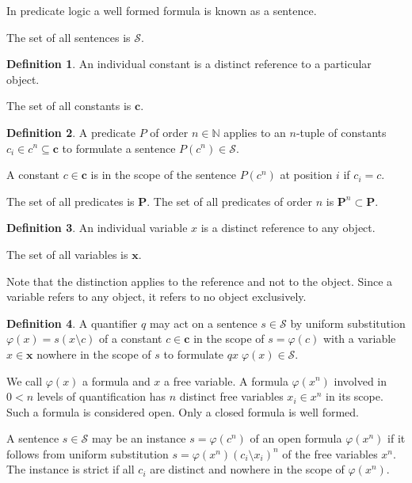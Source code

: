 \documentclass{amsbook}
\theoremstyle{definition}
\newtheorem{dfn}{Definition}[section]
\begin{document}
In predicate logic a well formed formula is known as a sentence.

The set of all sentences is $\mathcal S$.

\begin{dfn}
    An individual constant is a distinct reference to a particular object.

    The set of all constants is $\mathbf c$.
\end{dfn}

\begin{dfn}
    A predicate $P$ of order $n \in \mathbb N$ applies to an $n$-tuple of constants $c_i \in c^n \subseteq \mathbf c$ to formulate a sentence $P(c^n) \in \mathcal S$.

    A constant $c \in \mathbf c$ is in the scope of the sentence $P(c^n)$ at position $i$ if $c_i = c$.

    The set of all predicates is $\mathbf P$. The set of all predicates of order $n$ is $\mathbf P^n \subset \mathbf P$.
\end{dfn}

\begin{dfn}
    An individual variable $x$ is a distinct reference to any object.

    The set of all variables is $\mathbf x$.
\end{dfn}

Note that the distinction applies to the reference and not to the object. Since a variable refers to any object, it refers to no object exclusively.

\begin{dfn}
    A quantifier $q$ may act on a sentence $s \in \mathcal S$ by uniform substitution $\varphi(x) = s(x \setminus c)$ of a constant $c \in \mathbf c$ in the scope of $s = \varphi(c)$ with a variable $x \in \mathbf x$ nowhere in the scope of $s$ to formulate $qx\;\varphi(x) \in \mathcal S$.

    We call $\varphi(x)$ a formula and $x$ a free variable. A formula $\varphi(x^n)$ involved in $0 < n$ levels of quantification has $n$ distinct free variables $x_i \in x^n$ in its scope. Such a formula is considered open. Only a closed formula is well formed.

    A sentence $s \in \mathcal S$ may be an instance $s = \varphi(c^n)$ of an open formula $\varphi(x^n)$ if it follows from uniform substitution $s = \varphi(x^n)(c_i \setminus x_i)^n$ of the free variables $x^n$. The instance is strict if all $c_i$ are distinct and nowhere in the scope of $\varphi(x^n)$.
\end{dfn}
\end{document}
